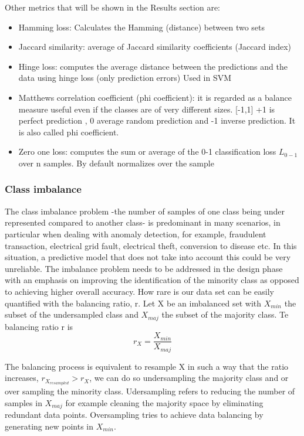 \documentclass[11pt]{article}
\begin{document}
Other metrics that will be shown in the Results section are:
\begin{itemize}
	\item Hamming loss: Calculates the Hamming (distance) between two sets
	\item Jaccard similarity: average of Jaccard similarity coefficients (Jaccard index)
	\item Hinge loss: computes the average distance between the predictions and the data using hinge loss (only prediction errors) Used in SVM
	\item Matthews correlation coefficient (phi coefficient): it is regarded as a balance measure useful even if the classes are of very different sizes. [-1,1] +1 is perfect prediction , 0 average random prediction and -1 inverse prediction. It is also called phi coefficient.
	\item Zero one loss: computes the sum or average of the 0-1 classification loss $L_{0-1}$ over n samples. By default normalizes over the sample
\end{itemize}

\subsubsection{Class imbalance}
The class imbalance problem -the number of samples of one class being under represented compared to another class- is predominant in many scenarios, in particular when dealing with anomaly detection, for example, fraudulent transaction, electrical grid fault, electrical theft, conversion to disease  etc. In this situation, a predictive model that does not take into account this could be very unreliable.
The imbalance problem needs to be addressed in the design phase with an emphasis on improving the identification of the minority class as opposed to achieving higher overall accuracy.
How rare is our data set can be easily quantified with the balancing ratio, r. Let X be an imbalanced set with $X_{min}$ the subset of the undersampled class and $X_{maj}$ the subset of the majority class. Te balancing ratio r is
\begin{equation}
r_X = \frac{X_{min}}{X_{maj}}
\end{equation}

The balancing process is equivalent to resample X in such a way that the ratio increases, $r_{X_{resampled}} > r_X$, we can do so undersampling the majority class and or over sampling the minority class. Udersampling refers to reducing the number of samples in $X_{maj}$ for example cleaning the majority space by eliminating redundant data points. Oversampling tries to achieve data balancing by generating new points in $X_{min}$.
\end{document}
